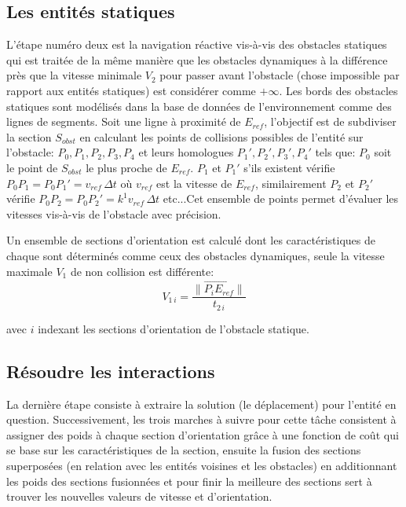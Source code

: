 \documentclass[11pt]{article}
\begin{document}
\subsection{Les entités statiques}

L'étape numéro deux est la navigation réactive vis-à-vis des obstacles statiques qui est traitée de la même manière que les obstacles dynamiques à la différence près que la vitesse minimale $V_2$ pour passer avant l'obstacle (chose impossible par rapport aux entités statiques) est considérer comme $+\infty$. Les bords des obstacles statiques sont modélisés dans la base de données de l'environnement comme des lignes de segments. Soit une ligne à proximité de $E_{ref}$, l'objectif est de subdiviser la section $S_{obst}$ en calculant les points de collisions possibles de l'entité sur l'obstacle: $P_0, P_1, P_2, P_3, P_4$ et leurs homologues $P_1\prime, P_2\prime, P_3\prime, P_4\prime$ tels que: $P_0$ soit le point de $S_{obst}$ le plus proche de $E_{ref}$. $P_1$ et $P_1\prime$ s'ils existent vérifie $P_0P_1 = P_0P_1\prime = v_{ref}\, \Delta t$ où $v_{ref}$ est la vitesse de $E_{ref}$, similairement $P_2$ et $P_2\prime$ vérifie $P_0P_2 = P_0P_2\prime = k^1 v_{ref}\,\Delta t$ etc...Cet ensemble de points permet d'évaluer les vitesses vis-à-vis  de l'obstacle avec précision.

Un ensemble de sections d'orientation est calculé dont les caractéristiques de chaque sont déterminés comme ceux des obstacles dynamiques, seule la vitesse maximale $V_1$ de non collision est différente: 
\begin{equation}
V_{1\,i} = \frac{\| \overrightarrow{P_iE_{ref}} \|}{t_{2\,i}} 
\end{equation}

avec $i$ indexant les sections d'orientation de l'obstacle statique.

\subsection{Résoudre les interactions}

La dernière étape consiste à extraire la solution (le déplacement) pour l'entité en question. Successivement, les trois marches à suivre pour cette tâche consistent à assigner des poids à chaque section d'orientation grâce à une fonction de coût qui se base sur les caractéristiques de la section, ensuite la fusion des sections superposées (en relation avec les entités voisines et les obstacles) en additionnant les poids des sections fusionnées et pour finir la meilleure des sections sert à trouver les nouvelles valeurs de vitesse et d'orientation.
\end{document}
